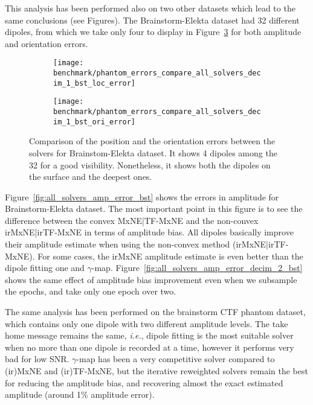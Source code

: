 This analysis has been performed also on two other datasets which lead to the same conclusions (see Figures). The Brainstorm-Elekta dataset had 32 different dipoles, from which we take only four to display in Figure~\ref{phantom_errors_compare_all_solvers_decim_1_bst_loc_error} for both amplitude and orientation errors.

\begin{figure}[p]
	\centering
    \begin{subfigure}{0.9\linewidth}
		\centering
		\texttt{[image: benchmark/phantom\_errors\_compare\_all\_solvers\_decim\_1\_bst\_loc\_error]}
	    \caption{\label{fig:phantom_errors_compare_all_solvers_decim_1_bst_loc_error}}
    \end{subfigure}
	\hspace{5cm}
	\hfill
    \begin{subfigure}{0.9\linewidth}  
		\centering 
		\texttt{[image: benchmark/phantom\_errors\_compare\_all\_solvers\_decim\_1\_bst\_ori\_error]}
		\caption{\label{fig:phantom_errors_compare_all_solvers_decim_1_bst_ori_error}}
	\end{subfigure}

		\caption{Comparison of the position and the orientation errors between the solvers for Brainstom-Elekta dataset. It shows 4 dipoles among the 32 for a good visibility. Nonetheless, it shows both the dipoles on the surface and the deepest ones.\label{phantom_errors_compare_all_solvers_decim_1_bst_loc_error}}
\end{figure}


Figure~\ref{fig:all_solvers_amp_error_bst} shows the errors in amplitude for Brainstorm-Elekta dataset. The most important point in this figure is to see the difference between the convex MxNE|TF-MxNE and the non-convex irMxNE|irTF-MxNE in terms of amplitude bias. All dipoles basically improve their amplitude estimate when using the non-convex method (irMxNE|irTF-MxNE). For some cases, the irMxNE amplitude estimate is even better than the dipole fitting one and $\gamma$-map. Figure~\ref{fig:all_solvers_amp_error_decim_2_bst} shows the same effect of amplitude bias improvement even when we subsample the epochs, and take only one epoch over two.

The same analysis has been performed on the brainstorm CTF phantom dataset, which contains only one dipole with two different amplitude levels. The take home message remains the same, \textit{i.e.}, dipole fitting is the most suitable solver when no more than one dipole is recorded at a time, however it performs very bad for low SNR. $\gamma$-map has been a very competitive solver compared to (ir)MxNE and (ir)TF-MxNE, but the iterative reweighted solvers remain the best for reducing the amplitude bias, and recovering almost the exact estimated amplitude (around 1\% amplitude error).

